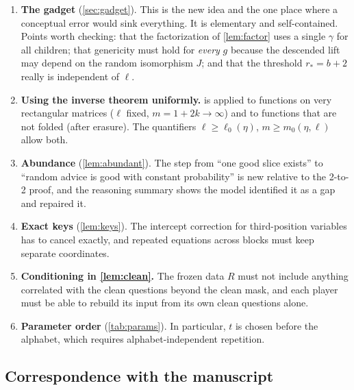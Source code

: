 \documentclass[11pt]{article}
\theoremstyle{definition}
\theoremstyle{remark}
\begin{document}
\begin{enumerate}
\item \textbf{The gadget} (\cref{sec:gadget}). This is the new idea and the
  one place where a conceptual error would sink everything. It is elementary
  and self-contained. Points worth checking: that the factorization of
  \cref{lem:factor} uses a single $\gamma$ for all children; that genericity
  must hold for \emph{every} $g$ because the descended lift may depend on the
  random isomorphism $J$; and that the threshold $r_*=b+2$ really is
  independent of $\ell$.
\item \textbf{Using the inverse theorem uniformly.}  is
  applied to functions on very rectangular matrices ($\ell$ fixed,
  $m=1+2k\to\infty$) and to functions that are not folded (after erasure). The
  quantifiers $\ell\ge\ell_0(\eta)$, $m\ge m_0(\eta,\ell)$ allow both.
\item \textbf{Abundance} (\cref{lem:abundant}). The step from ``one good
  slice exists'' to ``random advice is good with constant probability'' is new
  relative to the 2-to-2 proof, and the reasoning summary shows the model
  identified it as a gap and repaired it.
\item \textbf{Exact keys} (\cref{lem:keys}). The intercept correction for
  third-position variables has to cancel exactly, and repeated equations across
  blocks must keep separate coordinates.
\item \textbf{Conditioning in \cref{lem:clean}.} The frozen data $R$ must not
  include anything correlated with the clean questions beyond the clean mask,
  and each player must be able to rebuild its input from its own clean
  questions alone.
\item \textbf{Parameter order} (\cref{tab:params}). In particular, $t$ is chosen
  before the alphabet, which requires alphabet-independent repetition.
\end{enumerate}

\subsection{Correspondence with the manuscript}
\end{document}
